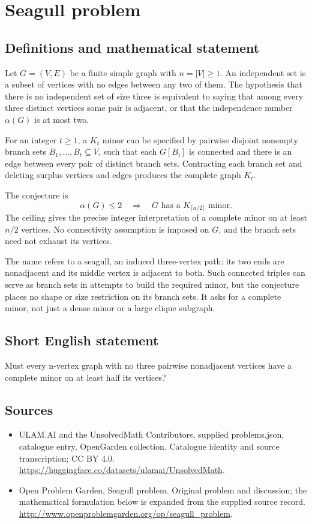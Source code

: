 \documentclass[11pt,a4paper]{article}
\begin{document}
\section*{Seagull problem}\label{statement}

\subsection{Definitions and mathematical statement}
Let $G=(V,E)$ be a finite simple graph with
$n=|V|\geq1$. An independent set is a subset of vertices
with no edges between any two of them. The hypothesis
that there is no independent set of size three is
equivalent to saying that among every three distinct
vertices some pair is adjacent, or that the independence
number $\alpha(G)$ is at most two.

For an integer $t\geq1$, a $K_t$ minor can be specified
by pairwise disjoint nonempty branch sets
$B_1,\ldots,B_t\subseteq V$, such that each $G[B_i]$
is connected and there is an edge between every pair
of distinct branch sets. Contracting each branch set
and deleting surplus vertices and edges produces the
complete graph $K_t$.

The conjecture is
\[
 \alpha(G)\leq2\quad\Longrightarrow\quad
 G\text{ has a }K_{\lceil n/2\rceil}\text{ minor}.
\]
The ceiling gives the precise integer interpretation
of a complete minor on at least $n/2$ vertices.
No connectivity assumption is imposed on $G$, and
the branch sets need not exhaust its vertices.

The name refers to a seagull, an induced three-vertex
path: its two ends are nonadjacent and its middle
vertex is adjacent to both. Such connected triples
can serve as branch sets in attempts to build the
required minor, but the conjecture places no shape
or size restriction on its branch sets. It asks
for a complete minor, not just a dense minor or
a large clique subgraph.
\subsection{Short English statement}
Must every n-vertex graph with no three pairwise nonadjacent vertices have a complete minor on at least half its vertices?
\subsection{Sources}
\begin{itemize}
\item[S1] ULAM.AI and the UnsolvedMath Contributors, supplied problems.json, catalogue entry, OpenGarden collection. Catalogue identity and source transcription; CC BY 4.0.
\url{https://huggingface.co/datasets/ulamai/UnsolvedMath}.
\item[S2] Open Problem Garden, Seagull problem. Original problem and discussion; the mathematical formulation below is expanded from the supplied source record.
\url{http://www.openproblemgarden.org/op/seagull_problem}.
\end{itemize}
\end{document}
